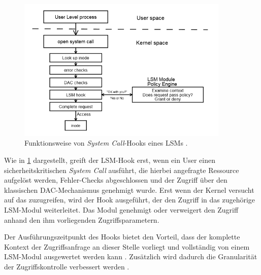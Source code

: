 \documentclass[../main.tex]{subfiles}
\begin{document}
			\begin{figure}[h]
					\centering
					\includegraphics[width=0.9\textwidth]{./images/sec_LSMHook.jpg}
					\caption{Funktionsweise von \emph{System Call}-Hooks eines LSMs \cite[S.3]{LSMFramework}.}
					\label{fig:sec_LSMHook}
			\end{figure}

			Wie in \fig \ref{fig:sec_LSMHook} dargestellt, greift der LSM-Hook erst, wenn ein User einen sicherheitskritischen \emph{System Call} ausführt, die hierbei angefragte Ressource aufgelöst werden, Fehler-Checks abgeschlossen und der Zugriff über den klassischen DAC-Mechanismus genehmigt wurde. Erst wenn der Kernel versucht auf das  zuzugreifen, wird der Hook ausgeführt, der den Zugriff in das zugehörige LSM-Modul weiterleitet. Das Modul genehmigt oder verweigert den Zugriff anhand den ihm vorliegenden Zugriffsparametern.

			Der Ausführungszeitpunkt des Hooks bietet den Vorteil, dass der komplette Kontext der Zugriffsanfrage an dieser Stelle vorliegt und vollständig von einem LSM-Modul ausgewertet werden kann \cite[S.2]{LSMFramework}. Zusätzlich wird dadurch die Granularität der Zugriffskontrolle verbessert werden \cite{LSMDesign}.



\end{document}
